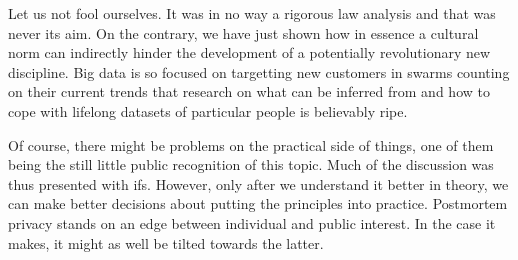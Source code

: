 \documentclass[a4paper]{article}
\begin{document}
Let us not fool ourselves. It was in no way a rigorous law analysis and that was never its aim. On the contrary, we have just shown how in essence a cultural norm can indirectly hinder the development of a potentially revolutionary new discipline. 
Big data is so focused on targetting new customers in swarms counting on their current trends that research on what can be inferred from and how to cope with lifelong datasets of particular people is believably  ripe. 

Of course, there might be problems on the practical side of things, one of them being the still little public recognition of this topic. Much of the discussion was thus presented with ifs. However, only after we understand it better in theory, we can make better decisions about putting the principles into practice. Postmortem privacy stands on an edge between individual and public interest. In the case it makes, it might as well be tilted towards the latter.
\end{document}
